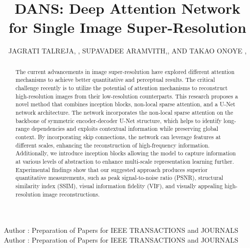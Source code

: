 \documentclass{ieeeaccess}
\begin{document}

\title{DANS: Deep Attention Network for Single Image Super-Resolution}
\author{\uppercase{Jagrati Talreja}, ,
\uppercase{SUPAVADEE ARAMVITH},, AND
\uppercase{Takao Onoye },
}
\address[1]{Department of Electrical Engineering, Faculty of Engineering, Chulalongkorn University, Bangkok 10330, Thailand.}
\address[2]{Multimedia Data Analytics and Processing Unit, Department of Electrical Engineering, Faculty of Engineering, Chulalongkorn University, Bangkok 10330, Thailand.}
\address[3]{Graduate School of Information Science and Technology, Osaka University, 1-5 Yamada-Oka, Suita, 565-0871 Japan}
 \markboth
{Author \headeretal: Preparation of Papers for IEEE TRANSACTIONS and JOURNALS}
{Author \headeretal: Preparation of Papers for IEEE TRANSACTIONS and JOURNALS}


\begin{abstract}
The current advancements in image super-resolution have explored different attention mechanisms to achieve better quantitative and perceptual results. The critical challenge recently is to utilize the potential of attention mechanisms to reconstruct high-resolution images from their low-resolution counterparts. This research proposes a novel method that combines inception blocks, non-local sparse attention, and a U-Net network architecture. The network incorporates the non-local sparse attention on the backbone of symmetric encoder-decoder U-Net structure, which helps to identify long-range dependencies and exploits contextual information while preserving global context. By incorporating skip connections, the network can leverage features at different scales, enhancing the reconstruction of high-frequency information. Additionally, we introduce inception blocks allowing the model to capture information at various levels of abstraction to enhance multi-scale representation learning further. Experimental findings show that our suggested approach produces superior quantitative measurements, such as peak signal-to-noise ratio (PSNR), structural similarity index (SSIM), visual information fidelity (VIF), and visually appealing high-resolution image reconstructions. 
\end{abstract}
\end{document}
